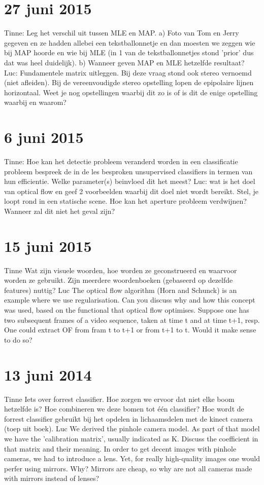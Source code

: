 \documentclass{article}
\begin{document}
\section*{27 juni 2015}
\begin{quest}
Tinne:
Leg het verschil uit tussen MLE en MAP.
a) Foto van Tom en Jerry gegeven en ze hadden allebei een tekstballonnetje en dan moesten we zeggen wie bij MAP hoorde en wie bij MLE (in 1 van de tekstballonnetjes stond 'prior' dus dat was heel duidelijk).
b) Wanneer geven MAP en MLE hetzelfde resultaat?
Luc:
Fundamentele matrix uitleggen. Bij deze vraag stond ook stereo vernoemd (niet afleiden).
Bij de vereenvoudigde stereo opstelling lopen de epipolaire lijnen horizontaal. Weet je nog opstellingen waarbij dit zo is of is dit de enige opstelling waarbij en waarom?
\end{quest}
\section*{6 juni 2015}
\begin{quest}
Tinne:
Hoe kan het detectie probleem veranderd worden in een classificatie probleem
bespreek de in de les besproken unsupervised classifiers in termen van hun efficientie. Welke parameter(s) beinvloed dit het meest?
Luc:
wat is het doel van optical flow en geef 2 voorbeelden waarbij dit doel niet wordt bereikt.
Stel, je loopt rond in een statische scene. Hoe kan het aperture probleem verdwijnen? Wanneer zal dit niet het geval zijn?
\end{quest}
\section*{15 juni 2015}
\begin{quest}
Tinne
Wat zijn visuele woorden, hoe worden ze geconstrueerd en waarvoor worden ze gebruikt.
Zijn meerdere woordenboeken (gebaseerd op dezelfde features) nuttig?
Luc
The optical flow algorithm (Horn and Schunck) is an example where we use regularisation. Can you discuss why and how this concept was used, based on the functional that optical flow optimises.
Suppose one has two subsequent frames of a video sequence, taken at time t and at time t+1, resp. One could extract OF from fram t to t+1 or from t+1 to t. Would it make sense to do so?
\end{quest}
\section*{13 juni 2014}
\begin{quest}
Tinne
Iets over forrest classifier.
Hoe zorgen we ervoor dat niet elke boom hetzelfde is?
Hoe combineren we deze bomen tot één classifier?
Hoe wordt de forrest classifier gebruikt bij het opdelen in lichaamsdelen met de kinect camera (toep uit boek).
Luc
We derived the pinhole camera model. As part of that model we have the 'calibration matrix', usually indicated as K. Discuss the coefficient in that matrix and their meaning.
In order to get decent images with pinhole cameras, we had to introduce a lens. Yet, for really high-quality images one would perfer using mirrors. Why? Mirrors are cheap, so why are not all cameras made with mirrors instead of lenses?
\end{quest}
\end{document}
